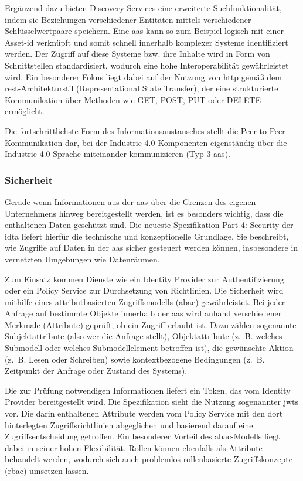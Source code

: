 Ergänzend dazu bieten Discovery Services eine erweiterte Suchfunktionalität, indem sie Beziehungen verschiedener Entitäten mittels verschiedener Schlüsselwertpaare speichern.
Eine \acs{aas} kann so zum Beispiel logisch mit einer Asset-\acs{id} verknüpft und somit schnell innerhalb komplexer Systeme identifiziert werden.
Der Zugriff auf diese Systeme bzw. ihre Inhalte wird in Form von Schnittstellen standardisiert, wodurch eine hohe Interoperabilität gewährleistet wird.
Ein besonderer Fokus liegt dabei auf der Nutzung von \ac{http} gemäß dem \acs{rest}-Architekturstil (Representational State Transfer), der eine strukturierte Kommunikation über Methoden wie GET, POST, PUT oder DELETE ermöglicht.

Die fortschrittlichste Form des Informationsaustausches stellt die Peer-to-Peer-Kommuni\-kation dar, bei der Industrie-4.0-Komponenten eigenständig über die Industrie-4.0-Sprache \cite{I4Sprache} miteinander kommunizieren (Typ-3-\acs{aas}).

\subsubsection{Sicherheit}
\label{sec: Sicherheit}
Gerade wenn Informationen aus der \acs{aas} über die Grenzen des eigenen Unternehmens hinweg bereitgestellt werden, ist es besonders wichtig, dass die enthaltenen Daten geschützt sind. 
Die neueste Spezifikation Part 4: Security \cite{SpezifikationPart4} der \acs{idta} liefert hierfür die technische und konzeptionelle Grundlage.
Sie beschreibt, wie Zugriffe auf Daten in der \acs{aas} sicher gesteuert werden können, insbesondere in vernetzten Umgebungen wie Datenräumen.

Zum Einsatz kommen Dienste wie ein Identity Provider zur Authentifizierung oder ein Policy Service zur Durchsetzung von Richtlinien.
Die Sicherheit wird mithilfe eines attributbasierten Zugriffsmodells (\ac{abac}) gewährleistet.
Bei jeder Anfrage auf bestimmte Objekte innerhalb der \acs{aas} wird anhand verschiedener Merkmale (Attribute) geprüft, ob ein Zugriff erlaubt ist.
Dazu zählen sogenannte Subjekt\-attribute (also wer die Anfrage stellt), Objektattribute (z.~B. welches Submodell oder welches Submodellelement betroffen ist), die gewünschte Aktion (z.~B. Lesen oder Schreiben) sowie kontextbezogene Bedingungen (z.~B. Zeitpunkt der Anfrage oder Zustand des Systems).

Die zur Prüfung notwendigen Informationen liefert ein Token, das vom Identity Provider bereitgestellt wird. 
Die Spezifikation sieht die Nutzung sogenannter \acp{jwt} vor.
Die darin enthaltenen Attribute werden vom Policy Service mit den dort hinterlegten Zugriffsrichtlinien abgeglichen und basierend darauf eine Zugriffsentscheidung getroffen.
Ein besonderer Vorteil des \acs{abac}-Modells liegt dabei in seiner hohen Flexibilität. 
Rollen können ebenfalls als Attribute behandelt werden, wodurch sich auch problemlos rollenbasierte Zugriffskonzepte (\ac{rbac}) umsetzen lassen. 

